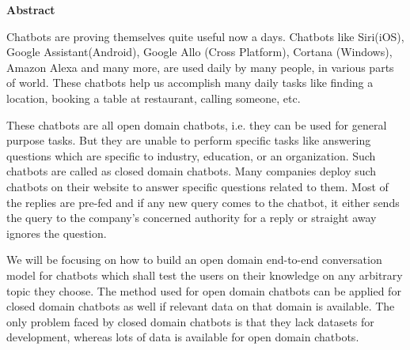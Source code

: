 \newpage
\begin{center}
\Large \textbf{Abstract}
\end{center}
	Chatbots are proving themselves quite useful now a days. Chatbots like
	Siri(iOS), Google Assistant(Android), Google Allo (Cross Platform),
	Cortana (Windows), Amazon Alexa and many more, are used daily by many
	people, in various parts of world. These chatbots help us accomplish
	many daily tasks like finding a location, booking a table at restaurant,
	calling someone, etc. 
	
	These chatbots are all open domain chatbots, i.e. they can be used for
	general purpose  tasks. But they are unable to perform specific tasks
	like answering questions which are specific to industry, education, or
	an organization. Such chatbots are called as closed domain chatbots.
	Many companies deploy such chatbots on their website to answer specific
	questions related to them. Most of the replies are pre-fed and if any
	new query comes to the chatbot, it either sends the query to the
	company’s concerned authority for a reply or straight away ignores the
	question.
	
	We will be focusing on how to build an open domain end-to-end
	conversation model for chatbots which shall test the users on their
	knowledge on any arbitrary topic they choose. The method used for open
	domain chatbots can be applied for closed domain chatbots as well if
	relevant data on that domain is available. The only problem faced by
	closed domain chatbots is that they lack datasets for development,
	whereas lots of data is available for open domain chatbots. 


